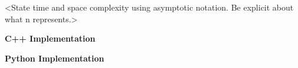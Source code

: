 \Complexity
<State time and space complexity using asymptotic notation.
Be explicit about what n represents.>

\bigskip
\noindent\textbf{C++ Implementation}



\bigskip
\noindent\textbf{Python Implementation}



\ProblemDivider
